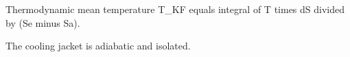 Thermodynamic mean temperature T_KF equals integral of T times dS divided by (Se minus Sa).  

The cooling jacket is adiabatic and isolated.
